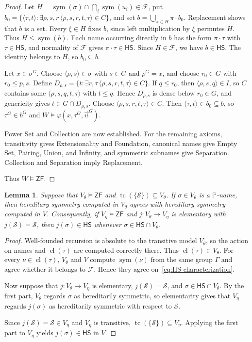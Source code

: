 \documentclass[11pt,a4paper]{amsart}
\newcommand{\ZF}{\mathsf{ZF}}
\newcommand{\HS}{\mathsf{HS}}
\newcommand{\sym}{\operatorname{sym}}
\newcommand{\tc}{\operatorname{tc}}
\theoremstyle{plain}
\newtheorem{lemma}[theorem]{Lemma}
\theoremstyle{definition}
\theoremstyle{remark}
\begin{document}
\begin{proof}
Let $H=\sym(\sigma)\cap\bigcap_i\sym(u_i)\in\mathcal F$, put $b_0=\bigl\{\langle\tau,t\rangle:\exists\rho,s,r\,\langle\rho,s,r,t,\tau\rangle\in C\bigr\}$, and set $b=\bigcup_{\pi\in H}\pi\cdot b_0$.
Replacement shows that $b$ is a set.  Every $\xi\in H$ fixes $b$, since left multiplication by $\xi$ permutes $H$.  Thus $H\leq\sym(b)$.  Each name occurring directly in $b$ has the form $\pi\cdot\tau$ with $\tau\in\HS$, and normality of $\mathcal F$ gives $\pi\cdot\tau\in\HS$.  Since $H\in\mathcal F$, we have $b\in\HS$.  The identity belongs to $H$, so $b_0\subseteq b$.

Let $x\in\sigma^G$.  Choose $\langle\rho,s\rangle\in\sigma$ with $s\in G$ and $\rho^G=x$, and choose $r_0\in G$ with $r_0\leq p,s$.  Define $D_{\rho,s}=\bigl\{t:\exists r,\tau\,\langle\rho,s,r,t,\tau\rangle\in C\bigr\}$.  If $q\leq r_0$, then $\langle\rho,s,q\rangle\in I$, so $C$ contains some $\langle\rho,s,q,t,\tau\rangle$ with $t\leq q$.  {Hence $D_{\rho,s}$ is dense below $r_0\in G$, and genericity gives $t\in G\cap D_{\rho,s}$.}  Choose $\langle\rho,s,r,t,\tau\rangle\in C$.  Then $\langle\tau,t\rangle\in b_0\subseteq b$, so $\tau^G\in b^G$ and $W\models\varphi(x,\tau^G,\vec u^G)$.

Power Set and Collection are now established.  For the remaining axioms, transitivity gives Extensionality and Foundation, canonical names give Empty Set, Pairing, Union, and Infinity, and symmetric subnames give Separation.  Collection and Separation imply Replacement.

Thus $W\models\ZF$.
\end{proof}
\begin{lemma}\label{lem:HS-absoluteness}
Suppose that $V_\theta\models\ZF$ and $\tc(\{\mathscr S\})\subseteq V_\theta$.  If $\sigma\in V_\theta$ is a $\mathbb P$-name, then hereditary symmetry computed in $V_\theta$ agrees with hereditary symmetry computed in $V$.  Consequently, if $V_\eta\models\ZF$ and $j:V_\theta\to V_\eta$ is elementary with $j(\mathscr S)=\mathscr S$, then $j(\sigma)\in\HS$ whenever $\sigma\in\HS\cap V_\theta$.
\end{lemma}

\begin{proof}
Well-founded recursion is absolute to the transitive model $V_\theta$, so the action on names and $\operatorname{cl}(\tau)$ are computed correctly there.  Thus $\operatorname{cl}(\tau)\in V_\theta$.  For every $\nu\in\operatorname{cl}(\tau)$, $V_\theta$ and $V$ compute $\sym(\nu)$ from the same group $\Gamma$ and agree whether it belongs to $\mathcal F$.  Hence they agree on~\eqref{eq:HS-characterization}.

Now suppose that $j:V_\theta\to V_\eta$ is elementary, $j(\mathscr S)=\mathscr S$, and $\sigma\in\HS\cap V_\theta$.  By the first part, $V_\theta$ regards $\sigma$ as hereditarily symmetric, so elementarity gives that $V_\eta$ regards $j(\sigma)$ as hereditarily symmetric with respect to $\mathscr S$.

Since $j(\mathscr S)=\mathscr S\in V_\eta$ and $V_\eta$ is transitive, $\tc(\{\mathscr S\})\subseteq V_\eta$.  Applying the first part to $V_\eta$ yields $j(\sigma)\in\HS$ in $V$.
\end{proof}
\end{document}
